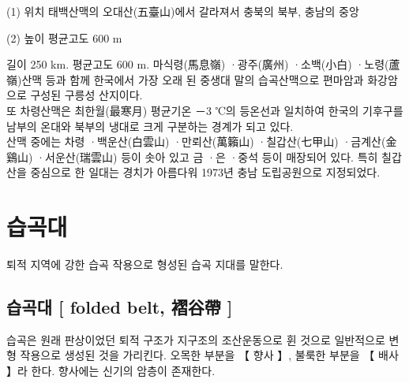 \documentclass[12pt,a4paper]{book}
\newcommand{\SectionMargin}			{\newpage  \null \vskip 0cm}
\begin{document}
			(1) 위치 
			태백산맥의 오대산(五臺山)에서 갈라져서 충북의 북부, 충남의 중앙 
			
			(2) 높이 
			평균고도 600 m 

길이 250 km. 평균고도 600 m. 마식령(馬息嶺) ·광주(廣州) ·소백(小白) ·노령(蘆嶺)산맥 등과 함께 한국에서 가장 오래 된 중생대 말의 습곡산맥으로 편마암과 화강암으로 구성된 구릉성 산지이다. \\

또 차령산맥은 최한월(最寒月) 평균기온 －3 ℃의 등온선과 일치하여 한국의 기후구를 남부의 온대와 북부의 냉대로 크게 구분하는 경계가 되고 있다. \\

산맥 중에는 차령 ·백운산(白雲山) ·만뢰산(萬籟山) ·칠갑산(七甲山) ·금계산(金鷄山) ·서운산(瑞雲山) 등이 솟아 있고 금 ·은 ·중석 등이 매장되어 있다. 특히 칠갑산을 중심으로 한 일대는 경치가 아름다워 1973년 충남 도립공원으로 지정되었다. 
 













\newpage
\chapter{습곡대}

	퇴적 지역에 강한 습곡 작용으로 형성된 습곡 지대를 말한다.  

	\SectionMargin
	\section{	습곡대 [ folded belt, 褶谷帶 ] }

		습곡은 원래 판상이었던 퇴적 구조가 지구조의 조산운동으로 휜 것으로 
		일반적으로 변형 작용으로 생성된 것을 가리킨다. 
		오목한 부분을 【 향사 】, 불룩한 부분을 【 배사 】라 한다. 향사에는 신기의 암층이 존재한다.
\end{document}
